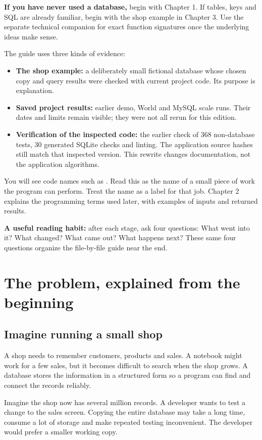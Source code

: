 \documentclass[12pt,a4paper,oneside]{report}
\begin{document}
\textbf{If you have never used a database,} begin with Chapter 1. If tables, keys and SQL are already familiar, begin with the shop example in Chapter 3. Use the separate technical companion for exact function signatures once the underlying ideas make sense.

The guide uses three kinds of evidence:
\begin{itemize}
\item \textbf{The shop example:} a deliberately small fictional database whose chosen copy and query results were checked with current project code. Its purpose is explanation.
\item \textbf{Saved project results:} earlier demo, World and MySQL scale runs. Their dates and limits remain visible; they were not all rerun for this edition.
\item \textbf{Verification of the inspected code:} the earlier check of 368 non-database tests, 30 generated SQLite checks and linting. The application source hashes still match that inspected version. This rewrite changes documentation, not the application algorithms.
\end{itemize}

You will see code names such as . Read this as the name of a small piece of work the program can perform. Treat the name as a label for that job. Chapter 2 explains the programming terms used later, with examples of inputs and returned results.

\textbf{A useful reading habit:} after each stage, ask four questions: What went into it? What changed? What came out? What happens next? These same four questions organize the file-by-file guide near the end.

\tableofcontents
\clearpage
{}

\chapter{The problem, explained from the beginning}
\section{Imagine running a small shop}
A shop needs to remember customers, products and sales. A notebook might work for a few sales, but it becomes difficult to search when the shop grows. A database stores the information in a structured form so a program can find and connect the records reliably.

Imagine the shop now has several million records. A developer wants to test a change to the sales screen. Copying the entire database may take a long time, consume a lot of storage and make repeated testing inconvenient. The developer would prefer a smaller working copy.
\end{document}
